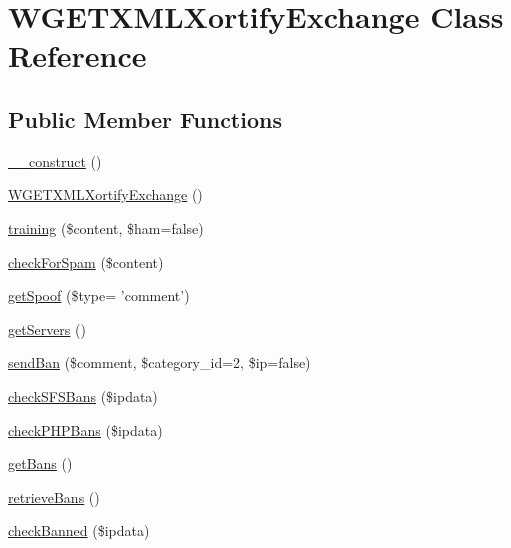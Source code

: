 \hypertarget{class_w_g_e_t_x_m_l_xortify_exchange}{\section{W\-G\-E\-T\-X\-M\-L\-Xortify\-Exchange Class Reference}
\label{class_w_g_e_t_x_m_l_xortify_exchange}
}
\subsection*{Public Member Functions}
\begin{DoxyCompactItemize}
\item 
\hyperlink{class_w_g_e_t_x_m_l_xortify_exchange_a095c5d389db211932136b53f25f39685}{\-\_\-\-\_\-construct} ()
\item 
\hyperlink{class_w_g_e_t_x_m_l_xortify_exchange_a7d7e5d1092a075a86ff1edb6bd5a4171}{W\-G\-E\-T\-X\-M\-L\-Xortify\-Exchange} ()
\item 
\hyperlink{class_w_g_e_t_x_m_l_xortify_exchange_a3b3be735e633ba330c6b5d086aa508cd}{training} (\$content, \$ham=false)
\item 
\hyperlink{class_w_g_e_t_x_m_l_xortify_exchange_a7a4f53c3841dc7806455261af557d514}{check\-For\-Spam} (\$content)
\item 
\hyperlink{class_w_g_e_t_x_m_l_xortify_exchange_ae7926cba79660f77479306100f492c03}{get\-Spoof} (\$type= 'comment')
\item 
\hyperlink{class_w_g_e_t_x_m_l_xortify_exchange_a882f365bc81e207dc2123ef707735e82}{get\-Servers} ()
\item 
\hyperlink{class_w_g_e_t_x_m_l_xortify_exchange_a0293acfa4afe0cb5b2816352a35d8ca7}{send\-Ban} (\$comment, \$category\-\_\-id=2, \$ip=false)
\item 
\hyperlink{class_w_g_e_t_x_m_l_xortify_exchange_a985a563a84e3e5c54694fcce192bda53}{check\-S\-F\-S\-Bans} (\$ipdata)
\item 
\hyperlink{class_w_g_e_t_x_m_l_xortify_exchange_aeb1bf9aaee4718870adbd07333490aaf}{check\-P\-H\-P\-Bans} (\$ipdata)
\item 
\hyperlink{class_w_g_e_t_x_m_l_xortify_exchange_aea26db2906896833d32445a698fc4cdc}{get\-Bans} ()
\item 
\hyperlink{class_w_g_e_t_x_m_l_xortify_exchange_a4af29af927aae9aada97ef0c2cd08fa1}{retrieve\-Bans} ()
\item 
\hyperlink{class_w_g_e_t_x_m_l_xortify_exchange_ae41df0f26620b727f7f63342648f6474}{check\-Banned} (\$ipdata)
\end{DoxyCompactItemize}
